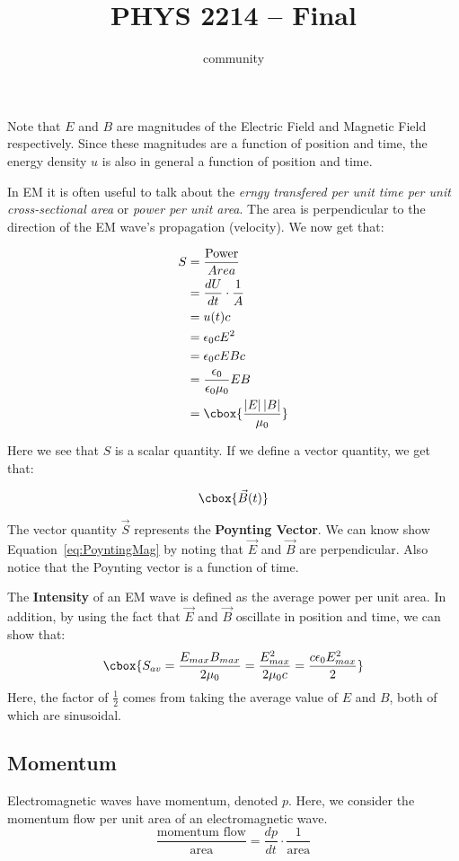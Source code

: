 \documentclass{hw} \title{PHYS 2214 -- Final} \author{community}
\numberwithin{equation}{section}
\begin{document}
Note that $E$ and $B$ are magnitudes of the Electric Field and Magnetic Field
respectively. Since these magnitudes are a function of position and time, the
energy density $u$ is also in general a function of position and time.

In EM it is often useful to talk about the \textit{erngy transfered per unit
time per unit cross-sectional area} or \textit{power per unit area}. The area
is perpendicular to the direction of the EM wave's propagation (velocity). We
now get that:

\begin{align} S &= \frac{\text{Power}}{{Area}}             \\ &= \frac{dU}{dt}
\cdot \frac{1}{A}         \\ &= u(t) c                                  \\ &=
\epsilon_0 cE^2                         \\ &= \epsilon_0 c E Bc
\\ &= \frac{\epsilon_0}{\epsilon_0 \mu_0} E B \\ &= \cbox{\frac{\left|E\right|
\left|B\right|}{\mu_0}} \label{eq:PoyntingMag} \end{align}

Here we see that $S$ is a scalar quantity. If we define a vector quantity, we
get that:

\begin{equation} \cbox{%
  \vec{B}(t) } \end{equation}

The vector quantity $\vec{S}$ represents the \textbf{Poynting Vector}. We can
know show Equation~\ref{eq:PoyntingMag} by noting that $\vec{E}$ and $\vec{B}$
are perpendicular. Also notice that the Poynting vector is a function of time.

The \textbf{Intensity} of an EM wave is defined as the average power per unit
area. In addition, by using the fact that $\vec{E}$ and $\vec{B}$ oscillate in
position and time, we can show that: \begin{equation} \cbox{%
    S_{av} = \frac{E_{max} B_{max}}{2\mu_0} = \frac{E_{max}^2}{2\mu_0 c} =
  \frac{c\epsilon_0 E_{max}^2}{2} } \end{equation} Here, the factor of
  $\frac{1}{2}$ comes from taking the average value of $E$ and $B$, both of
  which are sinusoidal.

\subsection{Momentum} Electromagnetic waves have momentum, denoted $p$. Here,
we consider the momentum flow per unit area of an electromagnetic wave.
\begin{equation}\label{eq:radiation-pressure} \frac{\text{momentum
  flow}}{\text{area}} = \frac{dp}{dt} \cdot \frac{1}{\text{area}}
\end{equation}
\end{document}
